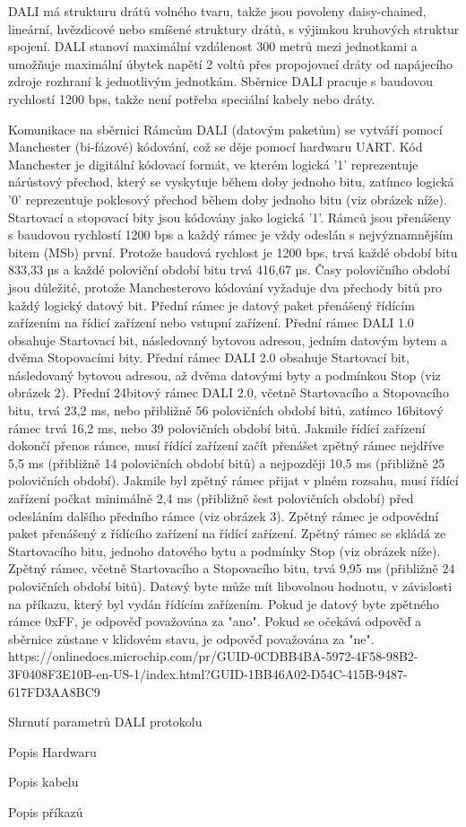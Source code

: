 DALI má strukturu drátů volného tvaru, takže jsou povoleny daisy-chained, lineární, hvězdicové nebo smíšené struktury drátů, s výjimkou kruhových struktur spojení. DALI stanoví maximální vzdálenost 300 metrů mezi jednotkami a umožňuje maximální úbytek napětí 2 voltů přes propojovací dráty od napájecího zdroje rozhraní k jednotlivým jednotkám. Sběrnice DALI pracuje s baudovou rychlostí 1200 bps, takže není potřeba speciální kabely nebo dráty.

\sec Komunikace na sběrnici
Rámcům DALI (datovým paketům) se vytváří pomocí Manchester (bi-fázové) kódování, což se děje pomocí hardwaru UART. Kód Manchester je digitální kódovací formát, ve kterém logická '1' reprezentuje nárůstový přechod, který se vyskytuje během doby jednoho bitu, zatímco logická '0' reprezentuje poklesový přechod během doby jednoho bitu (viz obrázek níže). Startovací a stopovací bity jsou kódovány jako logická '1'.
\medskip
Rámců jsou přenášeny s baudovou rychlostí 1200 bps a každý rámec je vždy odeslán s nejvýznamnějším bitem (MSb) první. Protože baudová rychlost je 1200 bps, trvá každé období bitu 833,33 µs a každé poloviční období bitu trvá 416,67 µs. Časy polovičního období jsou důležité, protože Manchesterovo kódování vyžaduje dva přechody bitů pro každý logický datový bit.
Přední rámec je datový paket přenášený řídícím zařízením na řídicí zařízení nebo vstupní zařízení.
Přední rámec DALI 1.0 obsahuje Startovací bit, následovaný bytovou adresou, jedním datovým bytem a dvěma Stopovacími bity.
\medskip
Přední rámec DALI 2.0 obsahuje Startovací bit, následovaný bytovou adresou, až dvěma datovými byty a podmínkou Stop (viz obrázek 2). Přední 24bitový rámec DALI 2.0, včetně Startovacího a Stopovacího bitu, trvá 23,2 ms, nebo přibližně 56 polovičních období bitů, zatímco 16bitový rámec trvá 16,2 ms, nebo 39 polovičních období bitů. Jakmile řídící zařízení dokončí přenos rámce, musí řídící zařízení začít přenášet zpětný rámec nejdříve 5,5 ms (přibližně 14 polovičních období bitů) a nejpozději 10,5 ms (přibližně 25 polovičních období). Jakmile byl zpětný rámec přijat v plném rozsahu, musí řídící zařízení počkat minimálně 2,4 ms (přibližně šest polovičních období) před odesláním dalšího předního rámce (viz obrázek 3).
Zpětný rámec je odpovědní paket přenášený z řídícího zařízení na řídící zařízení. Zpětný rámec se skládá ze Startovacího bitu, jednoho datového bytu a podmínky Stop (viz obrázek níže). Zpětný rámec, včetně Startovacího a Stopovacího bitu, trvá 9,95 ms (přibližně 24 polovičních období bitů). Datový byte může mít libovolnou hodnotu, v závislosti na příkazu, který byl vydán řídícím zařízením. Pokud je datový byte zpětného rámce 0xFF, je odpověď považována za "ano". Pokud se očekává odpověď a sběrnice zůstane v klidovém stavu, je odpověď považována za "ne".
\medskip
https://onlinedocs.microchip.com/pr/GUID-0CDBB4BA-5972-4F58-98B2-3F0408F3E10B-en-US-1/index.html?GUID-1BB46A02-D54C-415B-9487-617FD3AA8BC9
\medskip

\sec Shrnutí parametrů DALI protokolu

\sec Popis Hardwaru


\sec Popis kabelu

\sec Popis příkazů